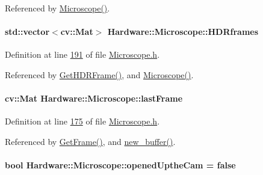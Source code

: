 Referenced by \hyperlink{_microscope_8cpp_source_l00021}{Microscope()}.

\hypertarget{class_hardware_1_1_microscope_a2c73db8010320428db3fd41d840dd0eb}{}
\paragraph[{H\+D\+Rframes}]{\setlength{\rightskip}{0pt plus 5cm}std\+::vector$<$cv\+::\+Mat$>$ Hardware\+::\+Microscope\+::\+H\+D\+Rframes\hspace{0.3cm}{\ttfamily [private]}}\label{class_hardware_1_1_microscope_a2c73db8010320428db3fd41d840dd0eb}


Definition at line \hyperlink{_microscope_8h_source_l00191}{191} of file \hyperlink{_microscope_8h_source}{Microscope.\+h}.



Referenced by \hyperlink{_microscope_8cpp_source_l00333}{Get\+H\+D\+R\+Frame()}, and \hyperlink{_microscope_8cpp_source_l00021}{Microscope()}.

\hypertarget{class_hardware_1_1_microscope_afd9597ab8447b75fdf5e74783fdcf7b2}{}
\paragraph[{last\+Frame}]{\setlength{\rightskip}{0pt plus 5cm}cv\+::\+Mat Hardware\+::\+Microscope\+::last\+Frame}\label{class_hardware_1_1_microscope_afd9597ab8447b75fdf5e74783fdcf7b2}


Definition at line \hyperlink{_microscope_8h_source_l00175}{175} of file \hyperlink{_microscope_8h_source}{Microscope.\+h}.



Referenced by \hyperlink{_microscope_8cpp_source_l00319}{Get\+Frame()}, and \hyperlink{_microscope_8cpp_source_l00413}{new\+\_\+buffer()}.

\hypertarget{class_hardware_1_1_microscope_ab1033afe167ab113639ea90c6b66544f}{}
\paragraph[{opened\+Upthe\+Cam}]{\setlength{\rightskip}{0pt plus 5cm}bool Hardware\+::\+Microscope\+::opened\+Upthe\+Cam = false\hspace{0.3cm}{\ttfamily [private]}}\label{class_hardware_1_1_microscope_ab1033afe167ab113639ea90c6b66544f}


